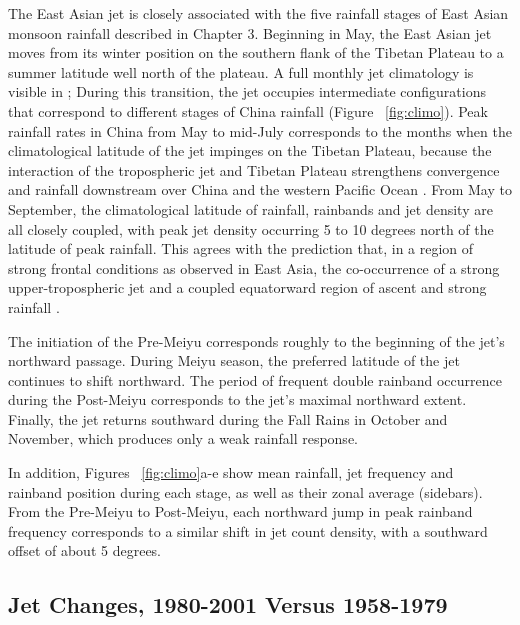 	The East Asian jet is closely associated with the five rainfall stages of East Asian monsoon rainfall described in Chapter 3. Beginning in May, the East Asian jet moves from its winter position on the southern flank of the Tibetan Plateau to a summer latitude well north of the plateau.  A full monthly jet climatology is visible in \citet{Schiemann2009}; During this transition, the jet occupies intermediate configurations that correspond to different stages of China rainfall (Figure ~\ref{fig:climo}). Peak rainfall rates in China from May to mid-July corresponds to the months when the climatological latitude of the jet impinges on the Tibetan Plateau, because the interaction of the tropospheric jet and Tibetan Plateau strengthens convergence and rainfall downstream over China and the western Pacific Ocean \citep{Molnar2010,Sampe2010,Chen2014}. From May to September,  the climatological latitude of rainfall, rainbands and jet density are all closely coupled, with peak jet density occurring 5 to 10 degrees north of the latitude of peak rainfall. This agrees with the prediction that, in a region of strong frontal conditions as observed in East Asia, the co-occurrence of a strong upper-tropospheric jet and a coupled equatorward region of ascent and strong rainfall \citep{Holton2004}. 
	
	The initiation of the Pre-Meiyu corresponds roughly to the beginning of the jet's northward passage. During Meiyu season, the preferred latitude of the jet continues to shift northward. The period of frequent double rainband occurrence during the Post-Meiyu corresponds to the jet's maximal northward extent. Finally, the jet returns southward during the Fall Rains in October and November, which produces only a weak rainfall response.
	
	In addition, Figures ~\ref{fig:climo}a-e show mean rainfall, jet frequency and rainband position during each stage, as well as their zonal average (sidebars). From the Pre-Meiyu to Post-Meiyu, each northward jump in peak rainband frequency corresponds to a similar shift in jet count density, with a southward offset of about 5 degrees.
	
\subsection{Jet Changes, 1980-2001 Versus 1958-1979}

